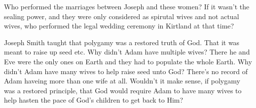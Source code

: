 Who performed the marriages between Joseph and these women? If it wasn't the sealing
power, and they were only considered as spirutal wives and not actual wives, who
performed the legal wedding ceremony in Kirtland at that time?

Joseph Smith taught that polygamy was a restored truth of God. That it was meant to
raise up seed etc. Why didn't Adam have multiple wives? There he and Eve were the
only ones on Earth and they had to populate the whole Earth. Why didn't Adam have
many wives to help raise seed unto God? There's no record of Adam haveing more than
one wife at all. Wouldn't it make sense, if polygamy was a restored principle, that
God would require Adam to have many wives to help hasten the pace of God's children
to get back to Him?